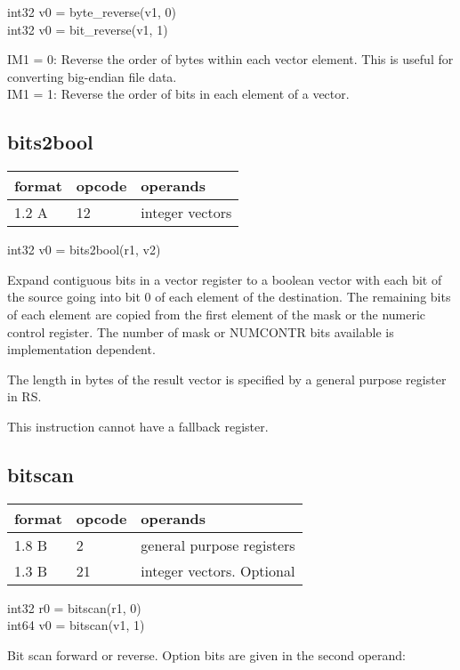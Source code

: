 \documentclass[forwardcom.tex]{subfiles}
\begin{document}
int32 v0 = byte\_reverse(v1, 0)\\
int32 v0 = bit\_reverse(v1, 1)
\vv

IM1 = 0: Reverse the order of bytes within each vector element. This is useful for converting big-endian file data.\\
IM1 = 1: Reverse the order of bits in each element of a vector.
\vv


\subsection{bits2bool}
\label{table:bits2boolInstruction}
\begin{tabular}{|p{12mm}|p{15mm}|p{100mm}|}
\hline
\bfseries format & \bfseries opcode & \bfseries operands \\ \hline
1.2 A & 12 & integer vectors \\ \hline
\end{tabular}
\vv

int32 v0 = bits2bool(r1, v2)
\vv

Expand contiguous bits in a vector register to a boolean vector with each bit of the source going into bit 0 of each element of the destination. 
The remaining bits of each element are copied from the first element of the mask or the numeric control register. The number of mask or NUMCONTR bits available is implementation dependent.
\vv

The length in bytes of the result vector is specified by a general purpose register in RS.
\vv

This instruction cannot have a fallback register.
\vv

\subsection{bitscan}
\label{table:bitscanInstruction}
\begin{tabular}{|p{12mm}|p{15mm}|p{100mm}|}
\hline
\bfseries format & \bfseries opcode & \bfseries operands \\ \hline
1.8 B &  2 & general purpose registers \\ \hline
1.3 B & 21 & integer vectors. Optional \\ \hline
\end{tabular}
\vv

int32 r0 = bitscan(r1, 0)\\
int64 v0 = bitscan(v1, 1)
\vv

Bit scan forward or reverse. Option bits are given in the second operand:
\vv
\end{document}
